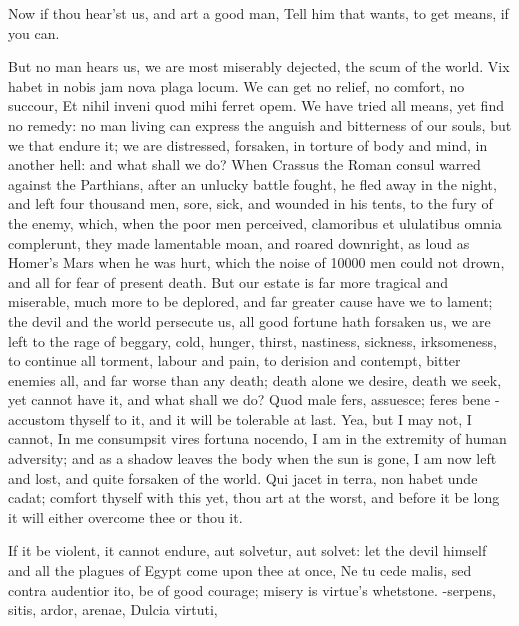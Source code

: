 {Now if thou hear'st us, and art a good man,
Tell him that wants, to get means, if you can.

But no man hears us, we are most miserably dejected, the scum of the
world. Vix habet in nobis jam nova plaga locum. We can get no
relief, no comfort, no succour, Et nihil inveni quod mihi ferret
opem. We have tried all means, yet find no remedy: no man living can
express the anguish and bitterness of our souls, but we that endure it;
we are distressed, forsaken, in torture of body and mind, in another
hell: and what shall we do? When Crassus the Roman consul warred
against the Parthians, after an unlucky battle fought, he fled away in
the night, and left four thousand men, sore, sick, and wounded in his
tents, to the fury of the enemy, which, when the poor men perceived,
clamoribus et ululatibus omnia complerunt, they made lamentable moan,
and roared downright, as loud as Homer's Mars when he was hurt, which
the noise of 10\thinspace{}000 men could not drown, and all for fear of present
death. But our estate is far more tragical and miserable, much more to
be deplored, and far greater cause have we to lament; the devil and the
world persecute us, all good fortune hath forsaken us, we are left to
the rage of beggary, cold, hunger, thirst, nastiness, sickness,
irksomeness, to continue all torment, labour and pain, to derision and
contempt, bitter enemies all, and far worse than any death; death alone
we desire, death we seek, yet cannot have it, and what shall we do?
Quod male fers, assuesce; feres bene -accustom thyself to it, and it
will be tolerable at last. Yea, but I may not, I cannot, In me
consumpsit vires fortuna nocendo, I am in the extremity of human
adversity; and as a shadow leaves the body when the sun is gone, I am
now left and lost, and quite forsaken of the world. Qui jacet in terra,
non habet unde cadat; comfort thyself with this yet, thou art at the
worst, and before it be long it will either overcome thee or thou it.

If it be violent, it cannot endure, aut solvetur, aut solvet: let the
devil himself and all the plagues of Egypt come upon thee at once, Ne
tu cede malis, sed contra audentior ito, be of good courage; misery is
virtue's whetstone.
-serpens, sitis, ardor, arenae,
Dulcia virtuti,

}
